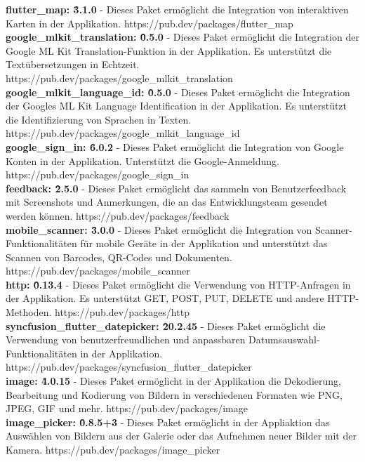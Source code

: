 \textbf{flutter\_map: \^3.1.0} - Dieses Paket ermöglicht die Integration von interaktiven Karten in der Applikation.
https://pub.dev/packages/flutter\_map
\\
\textbf{google\_mlkit\_translation: \^0.5.0} - Dieses Paket ermöglicht die Integration der Google ML Kit Translation-Funktion in der Applikation. Es unterstützt die Textübersetzungen in Echtzeit.
https://pub.dev/packages/google\_mlkit\_translation
\\
\textbf{google\_mlkit\_language\_id: \^0.5.0} - Dieses Paket ermöglicht die Integration der Googles ML Kit Language Identification in der Applikation. Es unterstützt die Identifizierung von Sprachen in Texten.
https://pub.dev/packages/google\_mlkit\_language\_id
\\
\textbf{google\_sign\_in: \^6.0.2} - Dieses Paket ermöglicht die Integration von Google Konten in der Applikation. Unterstützt die Google-Anmeldung.
https://pub.dev/packages/google\_sign\_in
\\
\textbf{feedback: \^2.5.0} - Dieses Paket ermöglicht das sammeln von Benutzerfeedback mit Screenshots und Anmerkungen, die an das Entwicklungsteam gesendet werden können.
https://pub.dev/packages/feedback
\\
\textbf{mobile\_scanner: \^3.0.0} - Dieses Paket ermöglicht die Integration von Scanner-Funktionalitäten für mobile Geräte in der Applikation und unterstützt das Scannen von Barcodes, QR-Codes und Dokumenten.
https://pub.dev/packages/mobile\_scanner
\\
\textbf{http: \^0.13.4} - Dieses Paket ermöglicht die Verwendung von HTTP-Anfragen in der Applikation. Es unterstützt GET, POST, PUT, DELETE und andere HTTP-Methoden.
https://pub.dev/packages/http
\\
\textbf{syncfusion\_flutter\_datepicker: \^20.2.45} - Dieses Paket ermöglicht die Verwendung von benutzerfreundlichen und anpassbaren Datumsauswahl-Funktionalitäten in der Applikation.
https://pub.dev/packages/syncfusion\_flutter\_datepicker
\\
\textbf{image: \^4.0.15} - Dieses Paket ermöglicht in der Applikation die Dekodierung, Bearbeitung und Kodierung von Bildern in verschiedenen Formaten wie PNG, JPEG, GIF und mehr.
https://pub.dev/packages/image
\\
\textbf{image\_picker: \^0.8.5+3} - Dieses Paket ermöglicht in der Appliaktion das Auswählen von Bildern aus der Galerie oder das Aufnehmen neuer Bilder mit der Kamera.
https://pub.dev/packages/image\_picker
\\
